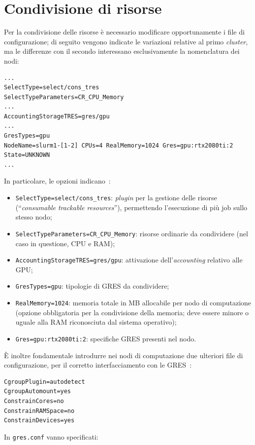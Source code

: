 \documentclass[12pt,a4paper,twoside,openright]{book}
\begin{document}
\section{Condivisione di risorse}
Per la condivisione delle risorse è necessario modificare opportunamente i file di configurazione; di seguito vengono indicate le variazioni relative al primo \textit{cluster}, ma le differenze con il secondo interessano esclusivamente la nomenclatura dei nodi:
\begin{verbatim}
...
SelectType=select/cons_tres
SelectTypeParameters=CR_CPU_Memory
...
AccountingStorageTRES=gres/gpu
...
GresTypes=gpu
NodeName=slurm1-[1-2] CPUs=4 RealMemory=1024 Gres=gpu:rtx2080ti:2 State=UNKNOWN
...
\end{verbatim}
In particolare, le opzioni indicano~\cite{slurmconstres}:
\begin{itemize}
    \item \texttt{SelectType=select/cons_tres}: \textit{plugin} per la gestione delle risorse (``\textit{consumable trackable resources}''), permettendo l'esecuzione di più job sullo stesso nodo;
    \item \texttt{SelectTypeParameters=CR_CPU_Memory}: risorse ordinarie da condividere (nel caso in questione, \ac{CPU} e \ac{RAM});
    \item \texttt{AccountingStorageTRES=gres/gpu}: attivazione dell'\textit{accounting} relativo alle \ac{GPU};
    \item \texttt{GresTypes=gpu}: tipologie di \acf{GRES} da condividere;
    \item \texttt{RealMemory=1024}: memoria totale in \ac{MB} allocabile per nodo di computazione (opzione obbligatoria per la condivisione della memoria; deve essere minore o uguale alla \ac{RAM} riconosciuta dal sistema operativo);
    \item \texttt{Gres=gpu:rtx2080ti:2}: specifiche \ac{GRES} presenti nel nodo.
\end{itemize}
È inoltre fondamentale introdurre nei nodi di computazione due ulteriori file di configurazione, per il corretto interfacciamento con le \ac{GRES}~\cite{slurmgres}:
\begin{verbatim}
CgroupPlugin=autodetect
CgroupAutomount=yes
ConstrainCores=no
ConstrainRAMSpace=no
ConstrainDevices=yes
\end{verbatim}
In \texttt{gres.conf} vanno specificati:
\end{document}
